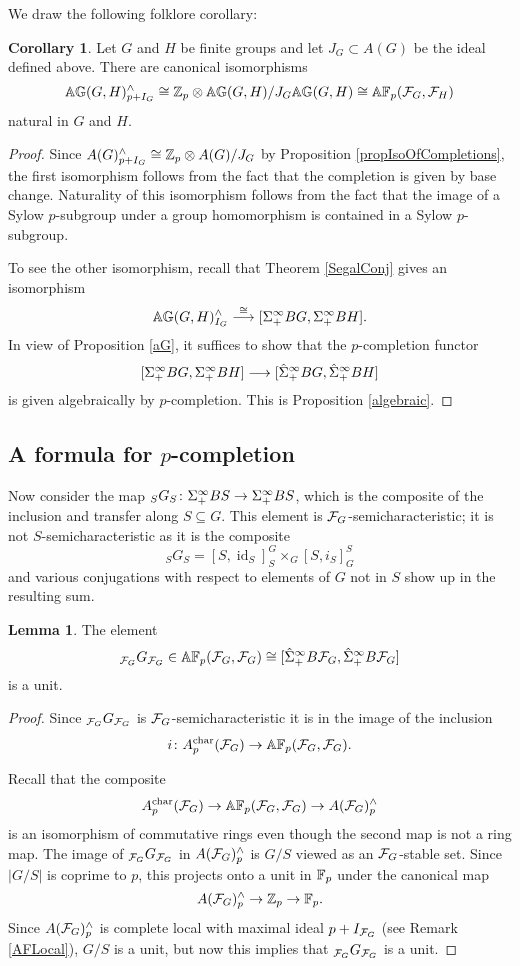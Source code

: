 \documentclass[10pt]{amsart}
\theoremstyle{definition}
\newtheorem{corollary}[theorem]{Corollary}
\newtheorem{lemma}[theorem]{Lemma}
\DeclareMathOperator{\id}{id}
\begin{document}
We draw the following folklore corollary:

\begin{corollary}
Let $G$ and $H$ be finite groups and let $J_G \subset A(G)$ be the ideal defined above. There are canonical isomorphisms
\[
\mathbb{A} \mathbb{G}(G,H)^{\wedge}_{p+I_G} \cong \mathbb{Z}_p \otimes \mathbb{A} \mathbb{G}(G,H)/J_G\mathbb{A} \mathbb{G}(G,H) \cong \mathbb{A} \mathbb{F}_p(\mathcal{F}_G,\mathcal{F}_H)
\]
natural in $G$ and $H$.
\end{corollary}
\begin{proof}
Since $A(G)^{\wedge}_{p+I_G} \cong \mathbb{Z}_p \otimes A(G)/J_G$ by Proposition \ref{propIsoOfCompletions}, the first isomorphism follows from the fact that the completion is given by base change. Naturality of this isomorphism follows from the fact that the image of a Sylow $p$-subgroup under a group homomorphism is contained in a Sylow $p$-subgroup.

To see the other isomorphism, recall that Theorem \ref{SegalConj} gives an isomorphism
\[
\mathbb{A} \mathbb{G}(G,H)^{\wedge}_{I_G} \overset{\cong}{\longrightarrow} [\Sigma^{\infty}_{+} BG, \Sigma^{\infty}_{+} BH].
\]
In view of Proposition \ref{aG}, it suffices to show that the $p$-completion functor
\[
[\Sigma^{\infty}_{+} BG, \Sigma^{\infty}_{+} BH] \overset{}{\longrightarrow} [\hat{\Sigma}^{\infty}_{+} BG, \hat{\Sigma}^{\infty}_{+} BH]
\]
is given algebraically by $p$-completion. This is Proposition \ref{algebraic}.
\end{proof}

\subsection{A formula for $p$-completion}

Now consider the map ${}_{S}G_{S} \colon \Sigma^{\infty}_{+} BS \rightarrow \Sigma^{\infty}_{+} BS$, which is the composite of the inclusion and transfer along $S \subseteq G$. This element is $\mathcal{F}_G$-semicharacteristic; it is not $S$-semicharacteristic as it is the composite
\[
{}_{S}G_{S} = [S, \id_S]_{S}^{G} \times_G [S,i_S]_{G}^{S}
\]
and various conjugations with respect to elements of $G$ not in $S$ show up in the resulting sum.

\begin{lemma} \label{invertiblemap}
The element
\[
{}_{\mathcal{F}_G}G_{\mathcal{F}_G} \in \mathbb{A} \mathbb{F}_p(\mathcal{F}_G, \mathcal{F}_G) \cong [\hat{\Sigma}^{\infty}_{+} B\mathcal{F}_G, \hat{\Sigma}^{\infty}_{+} B\mathcal{F}_G]
\]
is a unit.
\end{lemma}
\begin{proof}
Since ${}_{\mathcal{F}_G}G_{\mathcal{F}_G}$ is $\mathcal{F}_G$-semicharacteristic it is in the image of the inclusion
\[
i \colon A_{p}^{\text{char}}(\mathcal{F}_G) \rightarrow \mathbb{A} \mathbb{F}_p(\mathcal{F}_G,\mathcal{F}_G).
\]


Recall that the composite
\[
A_{p}^{\text{char}}(\mathcal{F}_G) \rightarrow \mathbb{A} \mathbb{F}_p(\mathcal{F}_G,\mathcal{F}_G) \rightarrow A(\mathcal{F}_G)^{\wedge}_{p}
\]
is an isomorphism of commutative rings even though the second map is not a ring map. The image of ${}_{\mathcal{F}_G}G_{\mathcal{F}_G}$ in $A(\mathcal{F}_G)^{\wedge}_{p}$ is $G/S$ viewed as an $\mathcal{F}_G$-stable set. Since $|G/S|$ is coprime to $p$, this projects onto a unit in $\mathbb{F}_p$ under the canonical map
\[
A(\mathcal{F}_G)^{\wedge}_{p} \rightarrow \mathbb{Z}_p \rightarrow \mathbb{F}_p.
\]
Since $A(\mathcal{F}_G)^{\wedge}_{p}$ is complete local with maximal ideal $p+I_{\mathcal{F}_G}$ (see Remark \ref{AFLocal}), $G/S$ is a unit, but now this implies that ${}_{\mathcal{F}_G}G_{\mathcal{F}_G}$ is a unit.
\end{proof}
\end{document}
